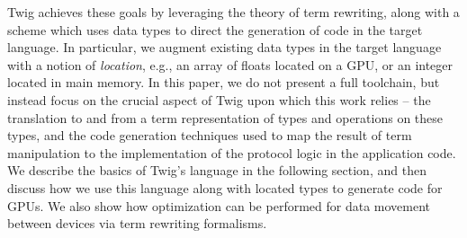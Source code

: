 Twig achieves these goals by leveraging the theory of term rewriting\cite{baader98rewriting}, along with a scheme which uses data types to direct the generation of code in the target language. In particular, we augment existing data types in the target language with a notion of \emph{location}, e.g., an array of floats located on a GPU, or an integer located in main memory. In this paper, we do not present a full toolchain, but instead focus on the crucial aspect of Twig upon which this work relies -- the translation to and from a term representation of types and operations on these types, and the code generation techniques used to map the result of term manipulation to the implementation of the protocol logic in the application code. We describe the basics of Twig's language in the following section, and then discuss how we use this language along with located types to generate code for GPUs. We also show how optimization can be performed for data movement between devices via term rewriting formalisms.
